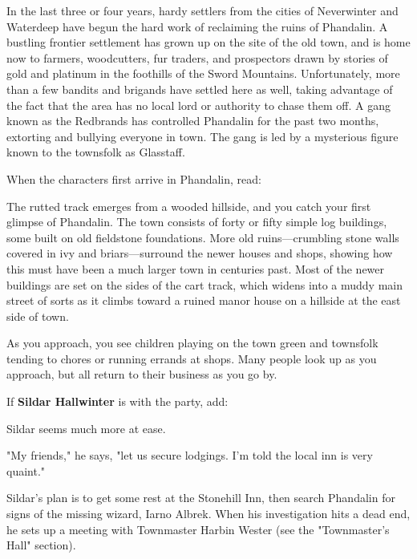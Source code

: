 \documentclass[10pt,a4paper,twoside,bg=print,twocolumn,openany,nodeprecatedcode]{dndbook}
\begin{document}
In the last three or four years, hardy settlers from the cities of Neverwinter and Waterdeep have begun the hard work of reclaiming the ruins of Phandalin. A bustling frontier settlement has grown up on the site of the old town, and is home now to farmers, woodcutters, fur traders, and prospectors drawn by stories of gold and platinum in the foothills of the Sword Mountains. Unfortunately, more than a few bandits and brigands have settled here as well, taking advantage of the fact that the area has no local lord or authority to chase them off. A gang known as the Redbrands has controlled Phandalin for the past two months, extorting and bullying everyone in town. The gang is led by a mysterious figure known to the townsfolk as Glasstaff.

When the characters first arrive in Phandalin, read:

\begin{DndReadAloud}{}
The rutted track emerges from a wooded hillside, and you catch your first glimpse of Phandalin. The town consists of forty or fifty simple log buildings, some built on old fieldstone foundations. More old ruins—crumbling stone walls covered in ivy and briars—surround the newer houses and shops, showing how this must have been a much larger town in centuries past. Most of the newer buildings are set on the sides of the cart track, which widens into a muddy main street of sorts as it climbs toward a ruined manor house on a hillside at the east side of town.

As you approach, you see children playing on the town green and townsfolk tending to chores or running errands at shops. Many people look up as you approach, but all return to their business as you go by.

\end{DndReadAloud}

If \textbf{Sildar Hallwinter} is with the party, add:

\begin{DndReadAloud}{}
Sildar seems much more at ease.

"My friends," he says, "let us secure lodgings. I'm told the local inn is very quaint."

\end{DndReadAloud}

Sildar's plan is to get some rest at the Stonehill Inn, then search Phandalin for signs of the missing wizard, Iarno Albrek. When his investigation hits a dead end, he sets up a meeting with Townmaster Harbin Wester (see the "Townmaster's Hall" section).
\end{document}
